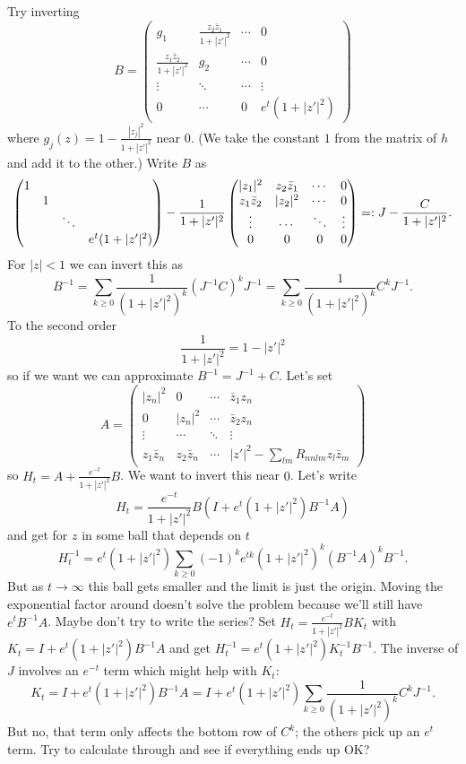 \documentclass[10pt,a4paper]{amsart}
\begin{document}
Try inverting
$$
B = \begin{pmatrix}
g_1 & \frac{z_2 \bar z_1}{1+|z'|^2} & \cdots & 0
\\
\frac{z_1 \bar z_2}{1+|z'|^2} & g_2 & \cdots & 0
\\
\vdots & \ddots & \cdots & \vdots
\\
0 & \cdots & 0 & e^t(1+|z'|^2)
\end{pmatrix}
$$
where $g_j(z) = 1 - \frac{|z_j|^2}{1+|z'|^2}$
near $0$.
(We take the constant $1$ from the matrix of $h$ and add it to the other.)
Write $B$ as
$$
\def\foo#1{#1}
\begin{pmatrix}
1 & & &
\\
& 1 & &
\\
& & \ddots &
\\
& & & e^t(1+|z'|^2)
\end{pmatrix}
-
\frac{1}{1+|z'|^2}
\begin{pmatrix}
\foo{|z_1|^2} & \foo{z_2 \bar z_1} & \cdots & 0
\\
\foo{z_1 \bar z_2} & \foo{|z_2|^2} & \cdots & 0
\\
\vdots & \cdots & \ddots & \vdots
\\
0 & 0 & 0 & 0
\end{pmatrix}
=: J -
\frac{C}{1+|z'|^2} .
$$
For $|z| < 1$ we can invert this as
$$
B^{-1}
= \sum_{k \geq 0} \frac{1}{(1+|z'|^2)^k} (J^{-1} C)^k J^{-1}
= \sum_{k \geq 0} \frac{1}{(1+|z'|^2)^k} C^k J^{-1}.
$$
To the second order
$$
\frac{1}{1+|z'|^2} = 1 - |z'|^2
$$
so if we want we can approximate $B^{-1} = J^{-1} + C$.
Let's set
$$
A =
\begin{pmatrix}
|z_n|^2 & 0 & \cdots & \bar z_1 z_n
\\
0 & |z_n|^2 & \cdots & \bar z_2 z_n
\\
\vdots & \cdots & \ddots & \vdots
\\
z_1 \bar z_n & z_2 \bar z_n & \cdots & |z'|^2
- \sum\limits_{lm} R_{nnlm} z_l \bar z_m
\end{pmatrix}
$$
so $H_t = A + \frac{e^{-t}}{1+|z'|^2} B$.
We want to invert this near $0$.
Let's write
$$
H_t = \frac{e^{-t}}{1+|z'|^2} B (I + e^t(1+|z'|^2) B^{-1}A)
$$
and get for $z$ in some ball that depends on $t$
$$
H_t^{-1}
= e^t(1+|z'|^2)
\sum_{k \geq 0} (-1)^k e^{tk} (1+|z'|^2)^k (B^{-1}A)^k B^{-1}.
$$
But as $t\to\infty$ this ball gets smaller and the limit is just the origin.
Moving the exponential factor around doesn't solve the problem because
we'll still have $e^t B^{-1}A$.
Maybe don't try to write the series?
Set $H_t = \frac{e^{-t}}{1+|z'|^2} B K_t$
with $K_t = I + e^t(1+|z'|^2) B^{-1}A$
and get $H_t^{-1} = e^t(1+|z'|^2) K_t^{-1} B^{-1}$.
The inverse of $J$ involves an $e^{-t}$ term which might help with $K_t$:
$$
K_t = I + e^t(1+|z'|^2) B^{-1}A
= I + e^t(1+|z'|^2) \sum_{k \geq 0} \frac{1}{(1+|z'|^2)^k} C^k J^{-1}.
$$
But no, that term only affects the bottom row of $C^k$; the others pick up an
$e^t$ term.
Try to calculate through and see if everything ends up OK?
\end{document}
